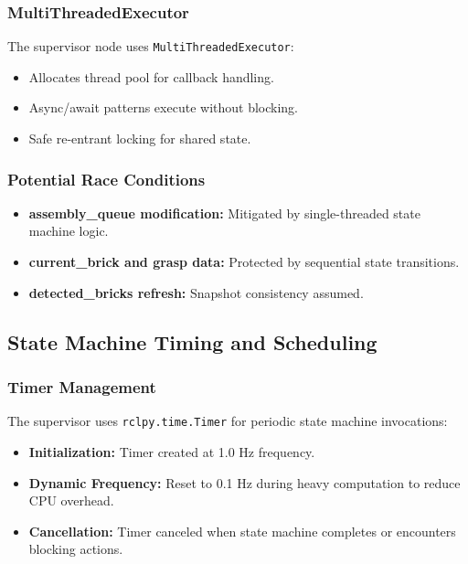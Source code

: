 \subsubsection{MultiThreadedExecutor}

The supervisor node uses \texttt{MultiThreadedExecutor}:
\begin{itemize}
    \item Allocates thread pool for callback handling.
    \item Async/await patterns execute without blocking.
    \item Safe re-entrant locking for shared state.
\end{itemize}

\subsubsection{Potential Race Conditions}

\begin{itemize}
    \item \textbf{assembly\_queue modification:} Mitigated by single-threaded state machine logic.
    \item \textbf{current\_brick and grasp data:} Protected by sequential state transitions.
    \item \textbf{detected\_bricks refresh:} Snapshot consistency assumed.
\end{itemize}

\subsection{State Machine Timing and Scheduling}

\subsubsection{Timer Management}

The supervisor uses \texttt{rclpy.time.Timer} for periodic state machine invocations:
\begin{itemize}
    \item \textbf{Initialization:} Timer created at 1.0 Hz frequency.
    \item \textbf{Dynamic Frequency:} Reset to 0.1 Hz during heavy computation to reduce CPU overhead.
    \item \textbf{Cancellation:} Timer canceled when state machine completes or encounters blocking actions.
\end{itemize}

